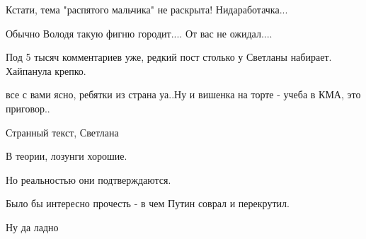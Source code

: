 \begin{itemize}
 
Кстати, тема "распятого мальчика" не раскрыта! Нидаработачка...

 
Обычно Володя такую фигню городит.... От вас не ожидал....

 
Под 5 тысяч комментариев уже, редкий пост столько у Светланы набирает. Хайпанула крепко.

 
все с вами ясно, ребятки из страна уа..Ну и вишенка на торте - учеба в КМА, это приговор..

 
Странный текст, Светлана

В теории, лозунги хорошие.

Но реальностью они подтверждаются.

Было бы интересно прочесть - в чем Путин соврал и перекрутил.

Ну да ладно

 


\end{itemize}
